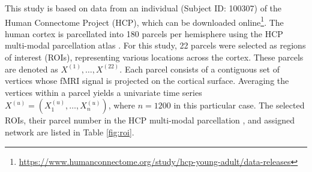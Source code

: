 This study is based on data from an individual (Subject ID: 100307) of the Human Connectome Project (HCP), which can be downloaded online\footnote{\url{https://www.humanconnectome.org/study/hcp-young-adult/data-releases}}. The human cortex is parcellated into 180 parcels per hemisphere using the HCP multi-modal parcellation atlas \cite{glasser}. For this study, 22 parcels were selected as regions of interest (ROIs), representing various locations across the cortex. These parcels are denoted as $X^{(1)}, \dots, X^{(22)}$. Each parcel consists of a contiguous set of vertices whose fMRI signal is projected on the cortical surface. Averaging the vertices within a parcel yields a univariate time series $X^{(u)} = (X^{(u)}_1, \dots, X^{(u)}_n)$, where $n = 1200$ in this particular case.
The selected ROIs, their parcel number in the HCP multi-modal parcellation \cite{glasser}, and assigned network are listed in Table \ref{fig:roi}. 
